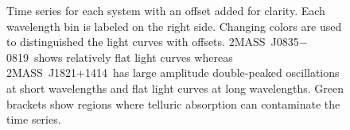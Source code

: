 \documentclass[twocolumn]{aastex6}
\newcommand{\sha}{2MASS~J0835$-$0819}
\newcommand{\shb}{2MASS~J1821+1414}
\begin{document}

\begin{figure}[!t]
\centering
{}
	\caption{Time series for each system with an offset added for clarity.
	Each wavelength bin is labeled on the right side. Changing colors are used to distinguished the light curves with offsets. \sha\ shows relatively flat light curves whereas \shb\ has large amplitude double-peaked oscillations at short wavelengths and flat light curves at long wavelengths.
	Green brackets show regions where telluric absorption can contaminate the time series.}
	\label{fig:tserDetrend}
\end{figure} 
\end{document}
